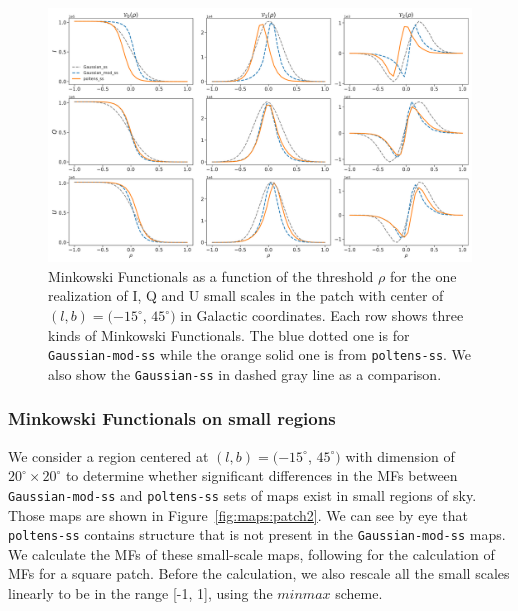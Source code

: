 \documentclass[twocolumn]{aastex631}
\begin{document}
\begin{figure}
    \centering
    \includegraphics[width=180mm]{figures/MFs_345_45_with_G_rescaled.pdf}
    \caption{Minkowski Functionals as a function of the threshold $\rho$ for the one realization of I, Q and U small scales in the patch with center of $(l, b) = (-15^{\circ}$, $45^{\circ})$ in Galactic coordinates. Each row shows three kinds of Minkowski Functionals. The blue dotted one is for \texttt{Gaussian-mod-ss} while the orange solid one is from \texttt{poltens-ss}. We also show the \texttt{Gaussian-ss} in dashed gray line as a comparison.}
    \label{fig:MF:patch2}
\end{figure}

\subsubsection{Minkowski Functionals on small regions}
We consider a region centered at $(l, b) = (-15^{\circ}$, $45^{\circ})$ with dimension of $20^{\circ}\times20^{\circ}$ to determine whether significant differences in the MFs between \texttt{Gaussian-mod-ss} and \texttt{poltens-ss} sets of maps exist in small regions of sky. Those maps are shown in Figure~\ref{fig:maps:patch2}. We can see by eye that \texttt{poltens-ss} contains structure that is not present in the \texttt{Gaussian-mod-ss} maps. We calculate the MFs of these small-scale maps, following \cite{Mantz:2008} for the calculation of MFs for a square patch. Before the calculation, we also rescale all the small scales linearly to be in the range [-1, 1], using the $minmax$ scheme.
\end{document}
